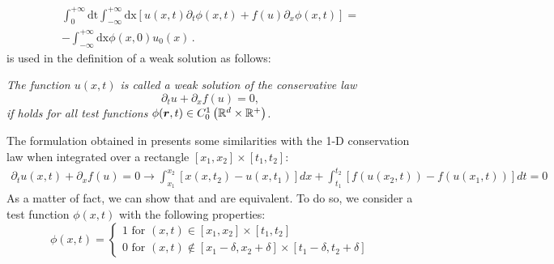 %
\begin{eqnarray}\label{eq:weak_sol3_sct1b}
\int_0^{+\infty}\text{dt}\int_{-\infty}^{+\infty}\text{dx} \left[ u(x,t) \partial_t \phi(x,t)   + f(u) \partial_x \phi(x,t)  \right] = \nonumber \\
-\int_{-\infty}^{+\infty}\text{dx} \phi(x,0) u_0(x) \,.
\end{eqnarray}
%
 is used in the definition of a weak solution as follows:
%
\begin{definition}
\emph{The function $u(x,t)$ is called a weak solution of the conservative law
%
\begin{equation}
\partial_t u + \partial_x f(u) = 0, \nonumber
\end{equation}
%
if  holds for all test functions $\phi(\boldsymbol r, t) \in C_0^1 \left( \mathbb{R}^d \times \mathbb{R}^+ \right)$.}
\end{definition}
%
The formulation obtained in  presents some similarities with the 1-D conservation law when integrated over a rectangle $\left[ x_1,x_2 \right] \times \left[ t_1,t_2 \right]$:
%
\begin{align}\label{eq:weak_sol4_sct1b}
\partial_t u(x,t) + \partial_x f(u) = 0 \to
\int_{x_1}^{x_2} \left[ x(x,t_2) - u(x,t_1) \right] dx + \int_{t_1}^{t_2} \left[ f(u(x_2,t)) - f(u(x_1,t)) \right]dt = 0
\end{align}
%
As a matter of fact, we can show that  and  are equivalent. To do so, we consider a test function $\phi(x,t)$ with the following properties:
%
\begin{equation}\label{eq:weak_sol5_sct1b}
\phi(x,t) = \left\{
\begin{array}{l}
1  \text{ for }  (x,t) \in \left[ x_1,x_2 \right] \times \left[ t_1,t_2 \right]  \\
0 \text{ for } (x,t) \notin \left[ x_1-\delta,x_2+\delta \right] \times \left[ t_1-\delta,t_2+\delta \right]
\end{array}\right.
\end{equation}
%
